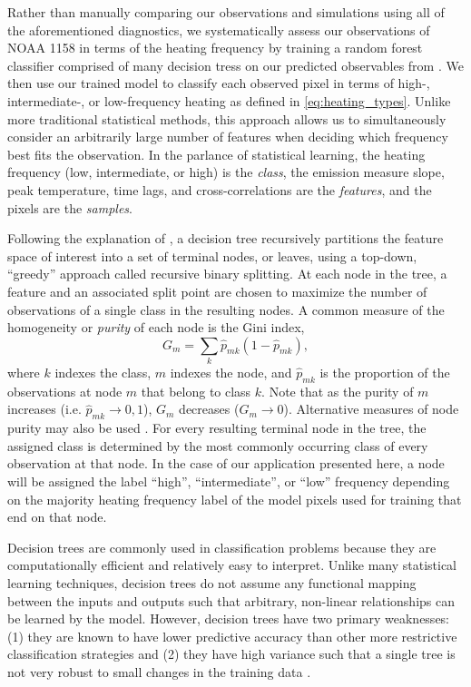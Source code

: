 Rather than manually comparing our observations and simulations using all of the aforementioned diagnostics, we systematically assess our observations of NOAA 1158 in terms of the heating frequency by training a random forest classifier comprised of many decision tress on our predicted observables from .
We then use our trained model to classify each observed pixel in terms of high-, intermediate-, or low-frequency heating as defined in \autoref{eq:heating_types}.
Unlike more traditional statistical methods, this approach allows us to simultaneously consider an arbitrarily large number of features when deciding which frequency best fits the observation.
In the parlance of statistical learning, the heating frequency (low, intermediate, or high) is the \textit{class}, the emission measure slope, peak temperature, time lags, and cross-correlations are the \textit{features}, and the pixels are the \textit{samples}.

Following the explanation of \citet[chapter 8]{james_introduction_2013}, a decision tree recursively partitions the feature space of interest into a set of terminal nodes, or leaves, using a top-down, ``greedy'' approach called recursive binary splitting.
At each node in the tree, a feature and an associated split point are chosen to maximize the number of observations of a single class in the resulting nodes.
A common measure of the homogeneity or \textit{purity} of each node is the Gini index,
\begin{equation}\label{eq:gini-index}
    G_m = \sum_k \hat{p}_{mk} (1 - \hat{p}_{mk}),
\end{equation}
where $k$ indexes the class, $m$ indexes the node, and $\hat{p}_{mk}$ is the proportion of the observations at node $m$ that belong to class $k$.
Note that as the purity of $m$ increases (i.e. $\hat{p}_{mk}\to0,1$), $G_m$ decreases ($G_m\to0$).
Alternative measures of node purity may also be used \citep[see section 9.2.3 of][]{hastie_elements_2009}.
For every resulting terminal node in the tree, the assigned class is determined by the most commonly occurring class of every observation at that node.
In the case of our application presented here, a node will be assigned the label ``high'', ``intermediate'', or ``low'' frequency depending on the majority heating frequency label of the model pixels used for training that end on that node.

Decision trees are commonly used in classification problems because they are computationally efficient and relatively easy to interpret.
Unlike many statistical learning techniques, decision trees do not assume any functional mapping between the inputs and outputs such that arbitrary, non-linear relationships can be learned by the model.
However, decision trees have two primary weaknesses: (1) they are known to have lower predictive accuracy than other more restrictive classification strategies and (2) they have high variance such that a single tree is not very robust to small changes in the training data \citep{james_introduction_2013}.

